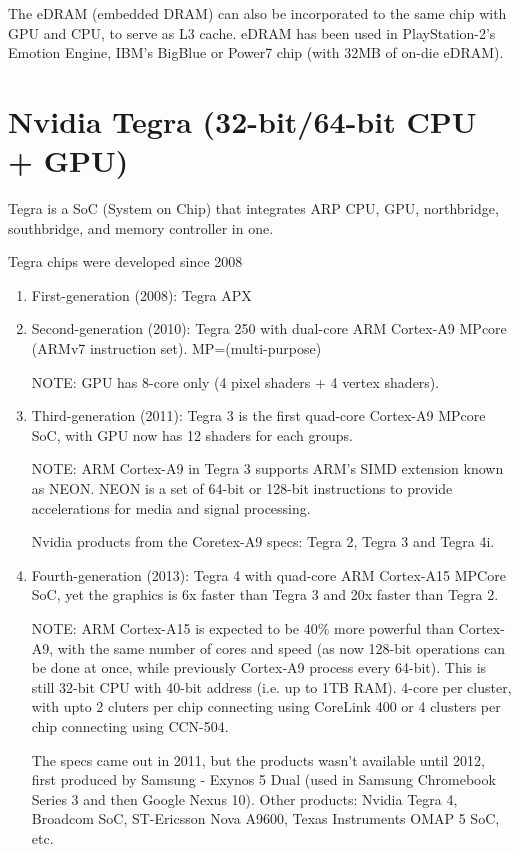 The eDRAM (embedded DRAM) can also be incorporated to the same chip
with GPU and CPU, to serve as L3 cache. eDRAM has been used in
PlayStation-2's Emotion Engine, IBM's BigBlue or Power7 chip (with
32MB of on-die eDRAM). 

\section{Nvidia Tegra (32-bit/64-bit CPU + GPU)}
\label{sec:Tegra_nvidia}
\label{sec:Denver_nvidia}

Tegra is a SoC (System on Chip) that integrates ARP CPU, GPU, northbridge,
southbridge, and memory controller in one. 


Tegra chips were developed since 2008
\begin{enumerate}
  \item First-generation (2008): Tegra APX
  \item Second-generation (2010): Tegra 250 with dual-core ARM Cortex-A9
  MPcore (ARMv7 instruction set). MP=(multi-purpose) 
  
  NOTE: GPU has 8-core only (4 pixel shaders + 4 vertex shaders).
  
  \item Third-generation (2011): Tegra 3 is the first quad-core Cortex-A9
  MPcore SoC, with GPU now has 12 shaders for each groups.
  
  NOTE: ARM Cortex-A9 in Tegra 3 supports ARM's SIMD extension known as NEON.
  NEON is a set of 64-bit or 128-bit instructions to provide accelerations for
  media and signal processing.
  
  Nvidia products from the Coretex-A9 specs: Tegra 2, Tegra 3 and Tegra 4i.
  
  \item Fourth-generation (2013): Tegra 4 with quad-core ARM Cortex-A15
  MPCore SoC, yet the graphics is 6x faster than Tegra 3 and 20x 
  faster than Tegra 2.
  
  NOTE: ARM Cortex-A15 is expected to be 40\% more powerful than Cortex-A9, with
  the same number of cores and speed (as now 128-bit operations can be done at
  once, while previously Cortex-A9 process every 64-bit).
  This is still 32-bit CPU with 40-bit address (i.e. up to 1TB RAM). 4-core per
  cluster, with upto 2 cluters per chip connecting using CoreLink 400 or 4
  clusters per chip connecting using CCN-504.
  
  The specs came out in 2011, but the products wasn't available until 2012,
  first produced by Samsung - Exynos 5 Dual (used in Samsung Chromebook Series 3
  and then Google Nexus 10). Other products: Nvidia Tegra 4, Broadcom SoC,
  ST-Ericsson Nova A9600, Texas Instruments OMAP 5 SoC, etc.
  

\end{enumerate}
